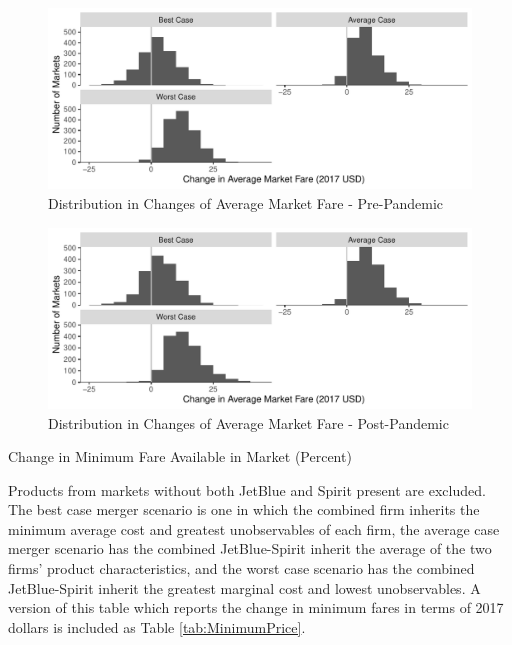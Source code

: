 \documentclass{article}
\begin{document}
    
    \begin{figure}
        \caption{Distribution in Changes of Average Market Fare - Pre-Pandemic}
        \label{fig:AverageFare_ChangeDist_PrePandemic}
        \begin{center}
        \includegraphics[width = \linewidth]{PrePandemic_Merger_Change_AverageFare_Dist.pdf}
        \end{center}
    \end{figure}

    \begin{figure}
        \caption{Distribution in Changes of Average Market Fare - Post-Pandemic}
        \label{fig:AverageFare_ChangeDist_PostPandemic}
        \begin{center}
        \includegraphics[width = \linewidth]{Merger_Change_AverageFare_Dist.pdf}
        \end{center}
    \end{figure}

    \begin{table}
        \caption{Change in Minimum Fare Available in Market (Percent)}
       \label{tab:MinimumPrice_Percent}
       \vspace{-15mm}
       \begin{center}
           
       \end{center}
       \vspace{-5mm}
       \footnotesize{Products from markets without both JetBlue and Spirit present are excluded. The best case merger scenario is one in which the combined firm inherits the minimum average cost and greatest unobservables of each firm, the average case merger scenario has the combined JetBlue-Spirit inherit the average of the two firms' product characteristics, and the worst case scenario has the combined JetBlue-Spirit inherit the greatest marginal cost and lowest unobservables. A version of this table which reports the change in minimum fares in terms of 2017 dollars is included as Table \ref{tab:MinimumPrice}.}
    \end{table}
\FloatBarrier
\end{document}
